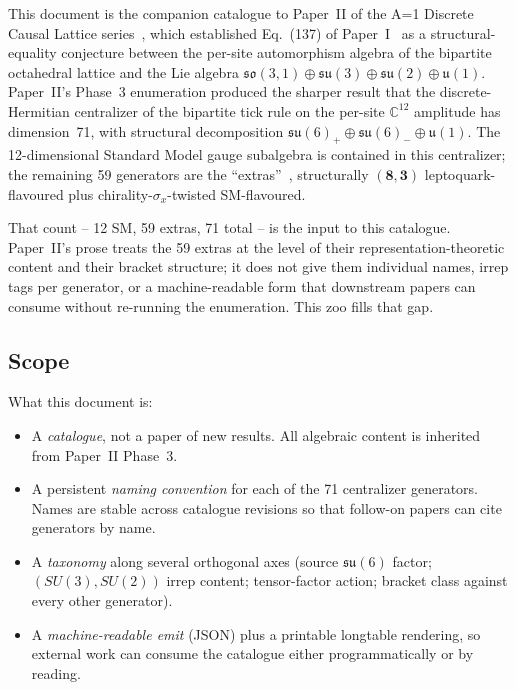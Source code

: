 
\label{sec:introduction}

This document is the companion catalogue to Paper~II of the A=1
Discrete Causal Lattice series~\cite{menendez2026sm}, which
established Eq.~(137) of Paper~I~\cite{menendez2026geometry} as a
structural-equality conjecture between the per-site automorphism
algebra of the bipartite octahedral lattice and the Lie algebra
$\mathfrak{so}(3,1) \oplus \mathfrak{su}(3) \oplus \mathfrak{su}(2)
\oplus \mathfrak{u}(1)$.  Paper~II's Phase~3 enumeration produced
the sharper result that the discrete-Hermitian centralizer of the
bipartite tick rule on the per-site $\mathbb{C}^{12}$ amplitude has
dimension~71, with structural decomposition $\mathfrak{su}(6)_+
\oplus \mathfrak{su}(6)_- \oplus \mathfrak{u}(1)$.  The
12-dimensional Standard Model gauge subalgebra is contained in
this centralizer; the remaining 59 generators are the
``extras''~\cite{georgi1999lie}, structurally $(\mathbf{8},
\mathbf{3})$ leptoquark-flavoured plus chirality-$\sigma_x$-twisted
SM-flavoured.

That count -- 12 SM, 59 extras, 71 total -- is the input to this
catalogue.  Paper~II's prose treats the 59 extras at the level of
their representation-theoretic content and their bracket structure;
it does not give them individual names, irrep tags per generator,
or a machine-readable form that downstream papers can consume
without re-running the enumeration.  This zoo fills that gap.

\subsection{Scope}
\label{subsec:scope}

What this document is:

\begin{itemize}
\item A \emph{catalogue}, not a paper of new results.  All
      algebraic content is inherited from Paper~II Phase~3.
\item A persistent \emph{naming convention} for each of the 71
      centralizer generators.  Names are stable across catalogue
      revisions so that follow-on papers can cite generators by
      name.
\item A \emph{taxonomy} along several orthogonal axes (source
      $\mathfrak{su}(6)$ factor; $(SU(3), SU(2))$ irrep content;
      tensor-factor action; bracket class against every other
      generator).
\item A \emph{machine-readable emit} (JSON) plus a printable
      longtable rendering, so external work can consume the
      catalogue either programmatically or by reading.
\end{itemize}


